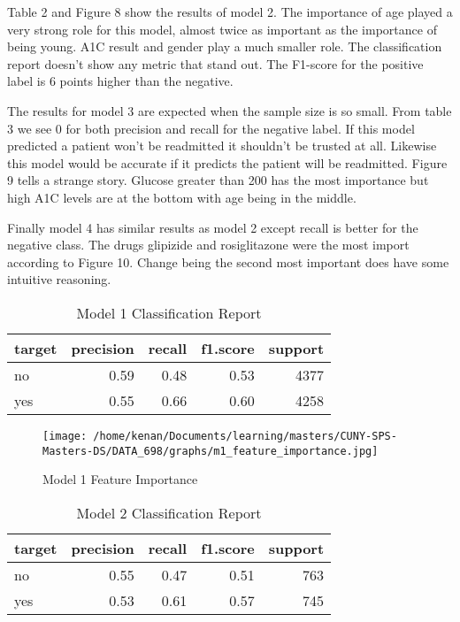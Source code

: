 \documentclass[5p]{elsarticle} %
\begin{document}
Table 2 and Figure 8 show the results of model 2. The importance of age
played a very strong role for this model, almost twice as important as
the importance of being young. A1C result and gender play a much smaller
role. The classification report doesn't show any metric that stand out.
The F1-score for the positive label is 6 points higher than the
negative.

The results for model 3 are expected when the sample size is so small.
From table 3 we see 0 for both precision and recall for the negative
label. If this model predicted a patient won't be readmitted it
shouldn't be trusted at all. Likewise this model would be accurate if it
predicts the patient will be readmitted. Figure 9 tells a strange story.
Glucose greater than 200 has the most importance but high A1C levels are
at the bottom with age being in the middle.

Finally model 4 has similar results as model 2 except recall is better
for the negative class. The drugs glipizide and rosiglitazone were the
most import according to Figure 10. Change being the second most
important does have some intuitive reasoning.

\clearpage
\onecolumn

\begin{table}

\caption{\label{tab:unnamed-chunk-3}Model 1 Classification Report}
\centering
\begin{tabular}[t]{l|r|r|r|r}
\hline
target & precision & recall & f1.score & support\\
\hline
no & 0.59 & 0.48 & 0.53 & 4377\\
\hline
yes & 0.55 & 0.66 & 0.60 & 4258\\
\hline
\end{tabular}
\end{table}

\begin{figure}
\hypertarget{id}{%
\centering
\texttt{[image: /home/kenan/Documents/learning/masters/CUNY-SPS-Masters-DS/DATA\_698/graphs/m1\_feature\_importance.jpg]}
\caption{Model 1 Feature Importance}\label{id}
}
\end{figure}

\begin{table}

\caption{\label{tab:unnamed-chunk-4}Model 2 Classification Report}
\centering
\begin{tabular}[t]{l|r|r|r|r}
\hline
target & precision & recall & f1.score & support\\
\hline
no & 0.55 & 0.47 & 0.51 & 763\\
\hline
yes & 0.53 & 0.61 & 0.57 & 745\\
\hline
\end{tabular}
\end{table}
\end{document}
